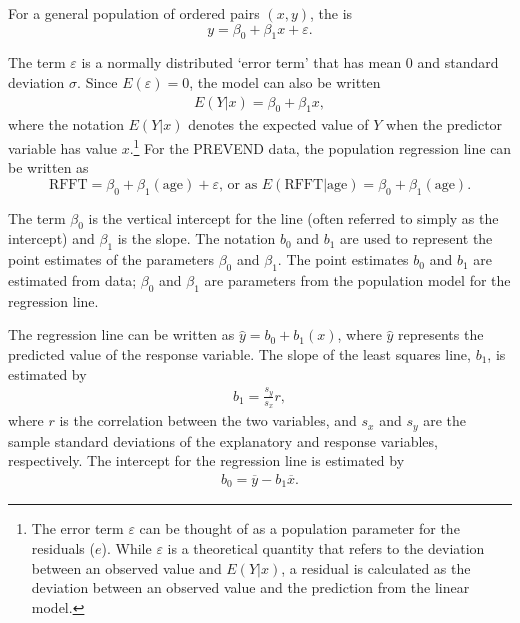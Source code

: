 For a general population of ordered pairs $(x,y)$, the  is
\[y = \beta_0 + \beta_1x + \varepsilon.
\label{equation:generalRegressionModel}
\]

The term $\varepsilon$ is a normally distributed `error term' that has mean 0 and standard deviation $\sigma$. Since $E(\varepsilon) = 0$,  the model can also be written
\begin{align*}
	E(Y|x) = \beta_0 + \beta_1 x,
\end{align*}
where the notation $E(Y|x)$ denotes the expected value of $Y$ when the predictor variable has value $x$.\footnote{The error term $\varepsilon$ can be thought of as a population parameter for the residuals ($e$). While $\varepsilon$ is a theoretical quantity that refers to the deviation between an observed value and $E(Y|x)$, a residual is calculated as the deviation between an observed value and the prediction from the linear model.} For the PREVEND data, the population regression line can be written as
\[\text{RFFT} = \beta_0 + \beta_{1}(\text{age}) + \varepsilon, \, \text{or as }
 E (\text{RFFT}| \text{age}) = \beta_0 + \beta_{1}(\text{age}).\]

The term $\beta_0$ is the vertical intercept for the line (often referred to simply as the intercept) and $\beta_1$ is the slope. The notation $b_0$ and $b_1$ are used to represent the point estimates of the parameters $\beta_0$ and $\beta_1$. The point estimates $b_0$ and $b_1$ are estimated from data; $\beta_0$ and $\beta_1$ are parameters from the population model for the regression line.

The regression line can be written as $\hat{y} = b_0 + b_1(x)$, where $\hat{y}$ represents the predicted value of the response variable. The slope of the least squares line, $b_1$, is estimated by
\begin{align}
b_1 = \frac{s_y}{s_x} r,
\label{slopeOfLSRLine}
\end{align}
where $r$ is the correlation between the two variables, and $s_x$ and $s_y$ are the sample standard deviations of the explanatory and response variables, respectively. The intercept for the regression line is estimated by
\begin{align}
b_0 = \overline{y} - b_1\overline{x}.
\label{interceptOfLSRLine}
\end{align}

